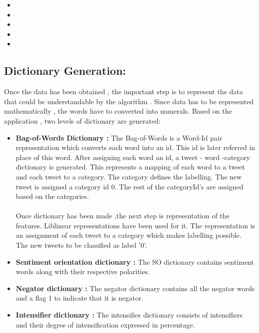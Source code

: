 \begin{itemize}

	\item	{}
	\item{}
	\item{}

	\item{}
	\item{}
\end{itemize}

\subsection{Dictionary Generation:}
\indent 
Once the data has been obtained , the important step is to represent the data that could be  understandable by the algorithm . Since data has to be represented mathematically , the words have to converted into numerals.   Based on the application , two levels of dictionary are generated:
\begin{itemize}
    \item \textbf{Bag-of-Words Dictionary :}
    \indent 
    The Bag-of-Words is a Word-Id pair representation which converts each word into an id. This id is later referred in place of this word. After assigning each word an id, a tweet - word -category dictionary is generated. This represents a mapping of each word to a tweet and each tweet to a category. The category defines the labelling. The new tweet is assigned a category id 0. The rest of the categoryId's are assigned based on the categories.
   \paragraph{}
   \indent 
   Once dictionary has been made ,the next step is representation of the features.
   Liblinear representations have been used for it. The representation is an assignment of each tweet to a category which makes  labelling possible. The new tweets to be classified as label '0'. 
   
   \item \textbf{Sentiment orientation dictionary :}
   \indent
   The SO dictionary contains sentiment words along with their respective polarities.
   
   \item \textbf{Negator dictionary :}
   \indent
   The negator dictionary contains all the negator words and a flag 1 to indicate that it is negator.
   
   \item \textbf{Intensifier dictionary :} 
   \indent
   The intensifier dictionary consists of intensifiers and their degree of intensification expressed in percentage.
    
    
\end{itemize}


